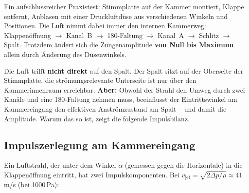 \documentclass[11pt,a4paper]{article}
\begin{document}
Ein aufschlussreicher Praxistest: Stimmplatte auf der Kammer montiert, Klappe entfernt, Anblasen mit einer Druckluftdüse aus verschiedenen Winkeln und Positionen. Die Luft nimmt dabei immer den internen Kammerweg: Klappenöffnung $\rightarrow$ Kanal~B $\rightarrow$ 180\textdegree-Faltung $\rightarrow$ Kanal~A $\rightarrow$ Schlitz $\rightarrow$ Spalt. Trotzdem ändert sich die Zungenamplitude \textbf{von Null bis Maximum} allein durch Änderung des Düsenwinkels.

\begin{warnbox}
Die Luft trifft \textbf{nicht direkt} auf den Spalt. Der Spalt sitzt auf der Oberseite der Stimmplatte, die strömungsrelevante Unterseite ist nur über den Kammerinnenraum erreichbar. \textbf{Aber:} Obwohl der Strahl den Umweg durch zwei Kanäle und eine 180\textdegree-Faltung nehmen muss, beeinflusst der Eintrittswinkel am Kammereingang den effektiven Anströmzustand am Spalt -- und damit die Amplitude. Warum das so ist, zeigt die folgende Impulsbilanz.
\end{warnbox}

\subsection{Impulszerlegung am Kammereingang}

Ein Luftstrahl, der unter dem Winkel $\alpha$ (gemessen gegen die Horizontale) in die Klappenöffnung eintritt, hat zwei Impulskomponenten. Bei $v_\text{jet} = \sqrt{2\Delta p/\rho} \approx 41$\,m/s (bei 1000\,Pa):

\begin{table}[H]
\centering\small
{}
\caption{Impulszerlegung des Eintrittstrahls am Kammereingang}
\end{table}
\end{document}

